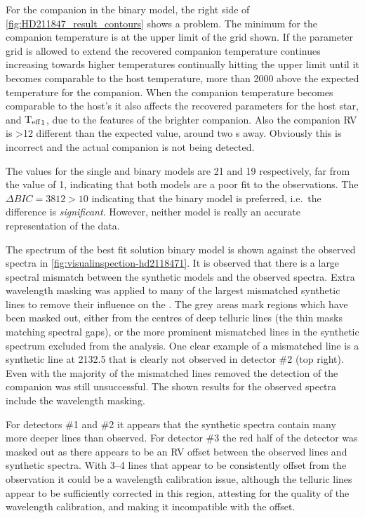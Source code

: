 For the companion in the binary model, the right side of \cref{fig:HD211847_result_contours} shows a problem.
The minimum \textchisquared{} for the companion temperature is at the upper limit of the grid shown.
If the parameter grid is allowed to extend the recovered companion temperature continues increasing towards higher temperatures continually hitting the upper limit until it becomes comparable to the host temperature, more than 2000\K{} above the expected temperature for the companion.
When the companion temperature becomes comparable to the host's it also affects the recovered parameters for the host star, \Rvone and \({\textrm{T}_{\mathrm{eff}}}_{1}\), due to the features of the brighter companion.
Also the companion {RV} is >12\kmps{} different than the expected value, around two \fwhm{}s away.
Obviously this is incorrect and the actual companion is not being detected.

The \textchisquaredreduced{} values for the single and binary models are 21 and 19 respectively, far from the value of 1, indicating that both models are a poor fit to the observations.
The \(\Delta {BIC} = 3812 >10\) indicating that the binary model is preferred, i.e.\ the difference is \textit{significant}. However, neither model is really an accurate representation of the data.

The spectrum of the best fit solution binary model is shown against the observed spectra in \cref{fig:visualinspection-hd2118471}.
It is observed that there is a large spectral mismatch between the synthetic models and the observed spectra.
Extra wavelength masking was applied to many of the largest mismatched synthetic lines to remove their influence on the \textchisquared{}.
The grey areas mark regions which have been masked out, either from the centres of deep telluric lines (the thin masks matching spectral gaps), or the more prominent mismatched lines in the synthetic spectrum excluded from the \textchisquared{} analysis.
One clear example of a mismatched line is a synthetic line at 2132.5\nm{} that is clearly not observed in detector \#2 (top right).
Even with the majority of the mismatched lines removed the detection of the companion was still unsuccessful.
The shown results for the observed spectra include the wavelength masking.

For detectors \#1 and \#2 it appears that the synthetic spectra contain many more deeper lines than observed.
For detector \#3 the red half of the detector was masked out as there appears to be an {RV} offset between the observed lines and synthetic spectra.
With 3--4 lines that appear to be consistently offset from the observation it could be a wavelength calibration issue, although the telluric lines appear to be sufficiently corrected in this region, attesting for the quality of the wavelength calibration, and making it incompatible with the offset.

